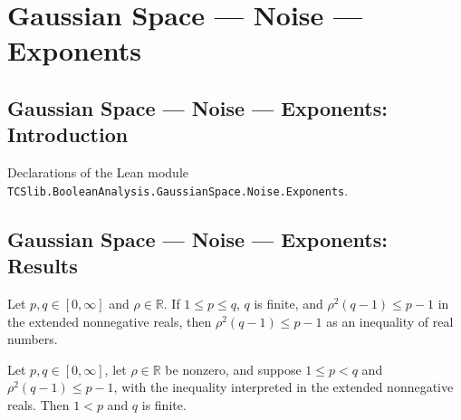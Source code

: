 \section{Gaussian Space --- Noise --- Exponents}
\subsection*{Gaussian Space --- Noise --- Exponents: Introduction}

Declarations of the Lean module \texttt{TCSlib.BooleanAnalysis.GaussianSpace.Noise.Exponents}.

\subsection*{Gaussian Space --- Noise --- Exponents: Results}

\begin{lemma}
\label{BooleanAnalysis.GaussianSpace.hypercontractive_toReal_condition}
\leanok
{}
Let $p,q\in[0,\infty]$ and $\rho\in\mathbb R$. If $1\le p\le q$, $q$ is finite, and
$\rho^2(q-1)\le p-1$ in the extended nonnegative reals, then $\rho^2(q-1)\le p-1$ as an
inequality of real numbers.
\end{lemma}

\begin{lemma}
\label{BooleanAnalysis.GaussianSpace.hypercontractive_exponents_of_nonzero}
\leanok
{}
Let $p,q\in[0,\infty]$, let $\rho\in\mathbb R$ be nonzero, and suppose $1\le p<q$ and
$\rho^2(q-1)\le p-1$, with the inequality interpreted in the extended nonnegative reals.
Then $1<p$ and $q$ is finite.
\end{lemma}
